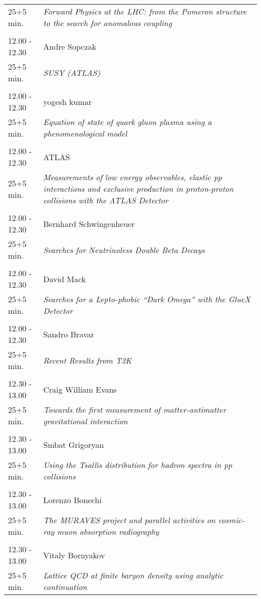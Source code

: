 \begin{longtable}{p{3cm}p{13cm}}
25+5 min. & {\it Forward Physics at the LHC: from the Pomeron structure to the search for anomalous coupling}\\ 
 & \\ 
12.00 - 12.30 & Andre Sopczak\\ 
25+5 min. & {\it SUSY (ATLAS)}\\ 
 & \\ 
12.00 - 12.30 & yogesh kumar\\ 
25+5 min. & {\it Equation of state of quark gluon plasma using a phenomenological model}\\ 
 & \\ 
12.00 - 12.30 & ATLAS\\ 
25+5 min. & {\it Measurements of low energy observables, elastic pp interactions and exclusive production in proton-proton collisions with the ATLAS Detector}\\ 
 & \\ 
12.00 - 12.30 & Bernhard Schwingenheuer\\ 
25+5 min. & {\it Searches for Neutrinoless Double Beta Decays}\\ 
 & \\ 
12.00 - 12.30 & David Mack\\ 
25+5 min. & {\it Searches for a Lepto-phobic “Dark Omega” with the GlueX Detector}\\ 
 & \\ 
12.00 - 12.30 & Sandro Bravar\\ 
25+5 min. & {\it Recent Results from T2K}\\ 
 & \\ 
12.30 - 13.00 & Craig William Evans\\ 
25+5 min. & {\it Towards the first measurement of matter-antimatter gravitational interaction}\\ 
 & \\ 
12.30 - 13.00 & Smbat Grigoryan\\ 
25+5 min. & {\it Using the Tsallis distribution for hadron spectra in pp collisions}\\ 
 & \\ 
12.30 - 13.00 & Lorenzo Bonechi\\ 
25+5 min. & {\it The MURAVES project and parallel activities on cosmic-ray muon absorption radiography}\\ 
 & \\ 
12.30 - 13.00 & Vitaly Bornyakov\\ 
25+5 min. & {\it Lattice QCD at finite baryon density using analytic continuation}\\ 

\end{longtable}
